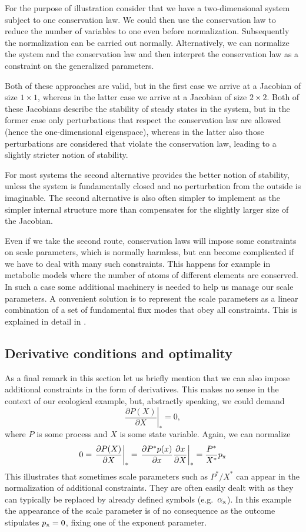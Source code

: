 \documentclass{article}
\newcommand{\eq}[1]{\begin{equation}#1\end{equation}}
\begin{document}
For the purpose of illustration consider that we have a two-dimensional system subject to one conservation law. We could then use the conservation law to reduce the number of variables to one even before normalization. Subsequently the normalization can be carried out normally. Alternatively, we can normalize the system and the conservation law and then interpret the conservation law as a constraint on the generalized parameters. 

Both of these approaches are valid, but in the first case we arrive at a Jacobian of size $1\times 1$, whereas in the latter case we arrive at a Jacobian of size $2\times 2$. Both of these Jacobians describe the stability of steady states in the system, but in the former case only perturbations that respect the conservation law are allowed (hence the one-dimensional eigenspace), whereas in the latter also those perturbations are considered that violate the conservation law, leading to a slightly stricter notion of stability.  

For most systems the second alternative provides the better notion of stability, unless the system is fundamentally closed and no perturbation from the outside is imaginable. The second alternative is also often simpler to implement as the simpler internal structure more than compensates for the slightly larger size of the Jacobian. 

Even if we take the second route, conservation laws will impose some constraints on scale parameters, which is normally harmless, but can become complicated if we have to deal with many such constraints.
This happens for example in metabolic models where the number of atoms of different elements are conserved. In such a case some additional machinery is needed to help us manage our scale parameters. A convenient solution is to represent the scale parameters as a linear combination of a set of fundamental flux modes that obey all constraints. This is explained in detail in \cite{Steuer2007BI}.   

\subsection{Derivative conditions and optimality}
As a final remark in this section let us briefly mention that we can also impose additional constraints in the form of derivatives. This makes no sense in the context of our ecological example, but, abstractly speaking, we could demand  
\eq{
    \left.\frac{\partial P(X)}{\partial X} \right|_* = 0, 
}
where $P$ is some process and $X$ is some state variable. Again, we can normalize
\eq{
  0 =  \left. \frac{\partial P(X)}{\partial X} \right|_* =  \left. \frac{\partial P^*p(x)}{\partial x}\frac{\partial x}{\partial X} \right|_* = \frac{P^*}{X^*} p_{\rm x}  
}
This illustrates that sometimes scale parameters such as $P^*/X^*$ can appear in the normalization of additional constraints. They are often easily dealt with as they can typically be replaced by already defined symbols (e.g.~$\alpha_{\rm x}$). In this example the appearance of the scale parameter is of no consequence as the outcome stipulates $p_{\rm x}=0$, fixing one of the exponent parameter. 
\end{document}
